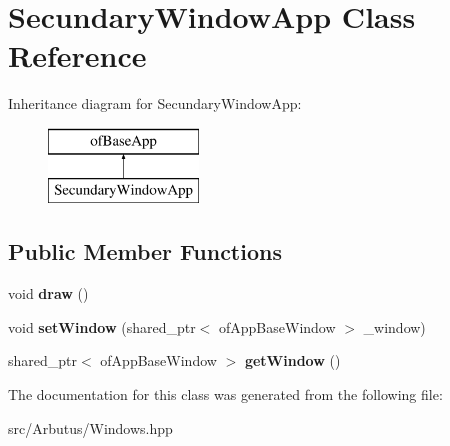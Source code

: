 \hypertarget{class_secundary_window_app}{}\section{Secundary\+Window\+App Class Reference}
\label{class_secundary_window_app}
Inheritance diagram for Secundary\+Window\+App\+:\begin{figure}[H]
\begin{center}
\leavevmode
\includegraphics[height=2.000000cm]{class_secundary_window_app}
\end{center}
\end{figure}
\subsection*{Public Member Functions}
\begin{DoxyCompactItemize}
\item 
\mbox{\label{class_secundary_window_app_af541b1d4d0f27d1eb8115af53c0fa41c}} 
void {\bfseries draw} ()
\item 
\mbox{\label{class_secundary_window_app_a7109dc6edd44c48abd71a1a8d22a242a}} 
void {\bfseries set\+Window} (shared\+\_\+ptr$<$ of\+App\+Base\+Window $>$ \+\_\+window)
\item 
\mbox{\label{class_secundary_window_app_abf4df7c0359364a14e04ceaed4871b59}} 
shared\+\_\+ptr$<$ of\+App\+Base\+Window $>$ {\bfseries get\+Window} ()
\end{DoxyCompactItemize}


The documentation for this class was generated from the following file\+:\begin{DoxyCompactItemize}
\item 
src/\+Arbutus/Windows.\+hpp\end{DoxyCompactItemize}
